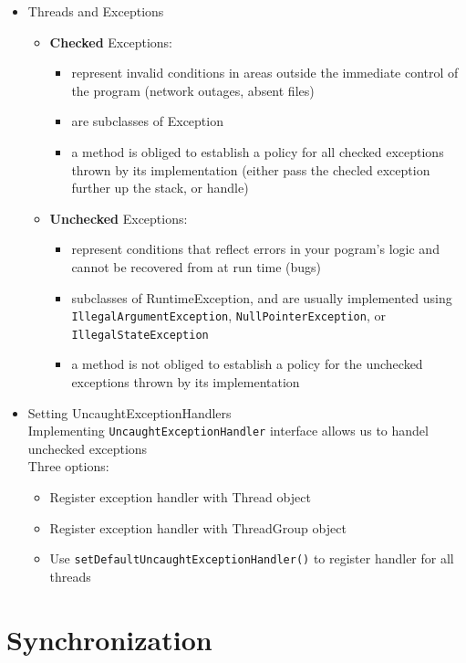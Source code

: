 \documentclass[a4paper]{article}
\newcommand{\inline}[1]{\lstinline!#1!}%
\begin{document}
\begin{itemize}
 		\item Threads and Exceptions
 			\begin{itemize}
 				\item \textbf{Checked} Exceptions:
 					\begin{itemize}
 						\item represent invalid conditions in areas outside the immediate control of the program (network outages, absent files)
 						\item are subclasses of Exception
 						\item a method is obliged to establish a policy for all checked exceptions thrown by its implementation (either pass the checled exception further up the stack, or handle)
 					\end{itemize}
 				\item \textbf{Unchecked} Exceptions:
 					\begin{itemize}
 						\item represent conditions that reflect errors in your pogram's logic and cannot be recovered from at run time (bugs)
 						\item subclasses of RuntimeException, and are usually implemented using \inline{IllegalArgumentException}, \inline{NullPointerException}, or \inline{IllegalStateException}
 						\item a method is not obliged to establish a policy for the unchecked exceptions thrown by its implementation
 					\end{itemize}
 			\end{itemize}
 		\item Setting UncaughtExceptionHandlers\\
 			Implementing \inline{UncaughtExceptionHandler} interface allows us to handel unchecked exceptions\\ Three options:
 			\begin{itemize}
 				\item Register exception handler with Thread object
 				\item Register exception handler with ThreadGroup object
 				\item Use \inline{setDefaultUncaughtExceptionHandler()} to register handler for all threads

 			\end{itemize}
	\end{itemize}
\section{Synchronization}
\end{document}
